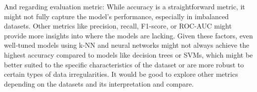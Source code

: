 \documentclass{article}
\begin{document}
And regarding evaluation metric: While accuracy is a straightforward metric, it might not fully capture the model's performance, especially in imbalanced datasets. Other metrics like precision, recall, F1-score, or ROC-AUC might provide more insights into where the models are lacking. Given these factors, even well-tuned models using k-NN and neural networks might not always achieve the highest accuracy compared to models like decision trees or SVMs, which might be better suited to the specific characteristics of the dataset or are more robust to certain types of data irregularities. It would be good to explore other metrics depending on the datasets and its interpretation and compare.
\end{document}
